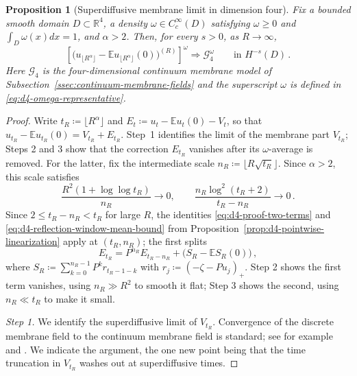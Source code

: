 \documentclass[11pt]{amsart}
\theoremstyle{plain}
\newtheorem{proposition}[theorem]{Proposition}
\theoremstyle{definition}
\newcommand{\R}{\mathbb{R}}
\newcommand{\E}{\mathbb{E}}
\begin{document}
		\begin{proposition}[Superdiffusive membrane limit in dimension four]
		\label{prop:d4-superdiffusive-limit}
			Fix a bounded smooth domain $D\subset\R^4$, a density $\omega\in C_c^\infty(D)$ satisfying $\omega\geq0$ and
			$\int_D\omega(x)dx=1$, and $\alpha>2$. Then, for every $s>0$, as $R\to\infty$,
			\[
				\left[\bigl(u_{\lfloor R^\alpha\rfloor}-\E u_{\lfloor R^\alpha\rfloor}(0)\bigr)^{(R)}\right]^\omega\Longrightarrow\mathcal G_4^\omega\qquad\text{in }H^{-s}(D)\, .
			\]
			Here $\mathcal G_4$ is the four-dimensional continuum membrane model of Subsection~\ref{ssec:continuum-membrane-fields} and the superscript $\omega$ is defined in \eqref{eq:d4-omega-representative}.
		\end{proposition}
		\begin{proof}
			Write $t_R\coloneqq\lfloor R^\alpha\rfloor$ and
			$E_t\coloneqq u_t-\E u_t(0)-V_t$, so that $u_{t_R}-\E u_{t_R}(0)=V_{t_R}+E_{t_R}$. Step~1 identifies the limit of the membrane part $V_{t_R}$; Steps 2 and 3 show that the correction $E_{t_R}$ vanishes after its $\omega$-average is removed. For the latter, fix the intermediate scale $n_R\coloneqq\lfloor R\sqrt{t_R}\rfloor$. Since $\alpha>2$, this scale satisfies
			\begin{equation}\label{eq:d4-superdiffusive-scale-separation}
				\frac{R^2(1+\log\log t_R)}{n_R}\longrightarrow0,\qquad\frac{n_R\log^2(t_R+2)}{t_R-n_R}\longrightarrow0\, .
			\end{equation}
			Since $2\leq t_R-n_R<t_R$ for large $R$, the identities \eqref{eq:d4-proof-two-terms} and \eqref{eq:d4-reflection-window-mean-bound} from Proposition~\ref{prop:d4-pointwise-linearization} apply at $(t_R,n_R)$; the first splits
			\begin{equation}\label{eq:d4-superdiffusive-decomposition}
				E_{t_R}=P^{n_R}E_{t_R-n_R}+\bigl(S_R-\E S_R(0)\bigr)\, ,
			\end{equation}
			where $S_R\coloneqq\sum_{k=0}^{n_R-1}P^kr_{t_R-1-k}$ with $r_j\coloneqq(-\zeta-Pu_j)_+$. Step 2 shows the first term vanishes, using $n_R\gg R^2$ to smooth it flat; Step 3 shows the second, using $n_R\ll t_R$ to make it small.

			\smallskip
			\noindent\emph{Step 1.} We identify the superdiffusive limit of $V_{t_R}$. Convergence of the discrete membrane field to the continuum membrane field is standard; see for example \citet*[Theorem~2]{CHR} and \citet*[Theorem~3.11]{CDH}. We indicate the argument, the one new point being that the time truncation in $V_{t_R}$ washes out at superdiffusive times.


\end{proof}
\end{document}
